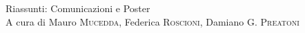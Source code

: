 \documentclass[final,italian]{memoir}
\begin{document}
\begin{hysbackcover}      %

Riassunti: Comunicazioni e Poster\\

A cura di Mauro \textsc{Mucedda}, Federica \textsc{Roscioni}, Damiano G. \textsc{Preatoni}

\end{hysbackcover}
\clearpage
\end{document}
